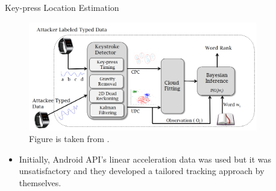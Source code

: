 \documentclass[ucs,9pt]{beamer}
\begin{document}
\begin{frame}{Key-press Location Estimation}
	\begin{figure}
		\centering
		\includegraphics[width=10cm]{imgs/moleOverview}
		\caption{Figure is taken from \cite{b1}.}
	\end{figure}
	\begin{itemize}
		\item Initially, Android API's linear acceleration data was used but it was unsatisfactory and they developed a tailored tracking approach by themselves. 
	\end{itemize}
\end{frame}
\end{document}
